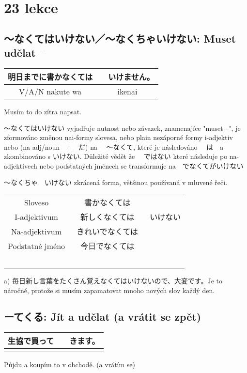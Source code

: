 \section{23 lekce}
\label{sec:lekce_23}




\subsection{〜なくてはいけない／〜なくちゃいけない: Muset udělat --}


\begin{center}
\begin{tabular}{||c|c||}
\hline
明日までに書かなくては&　いけません。\\
\hline
V/A/N nakute wa& ikenai\\
\hline
\end{tabular}
\end{center}

Musím to do zítra napsat.

〜なくてはいけない vyjadřuje nutnost nebo závazek, znamenajíce "muset --", je zformováno změnou nai-formy slovesa, nebo plain nezáporné formy i-adjektiv nebo (na-adj/noun　+　だ) na 　〜なくて, které je následováno 　は　a zkombinováno s いけない. Důležité vědět že 　ではない které následuje po na-adjektivech nebo podstatných jménech se transformuje na　でなくてがいけない

〜なくちゃ　いけない zkrácená forma, většinou používaná v mluvené řeči.

\begin{center}
\begin{tabular}{|c|c|c|}
\hline
Sloveso &書かなくては&\\
I-adjektivum&新しくなくては		&			いけない\\
Na-adjektivum&きれいでなくては&\\
Podstatné jméno&今日でなくては　　&\\
\hline　　
\end{tabular}
\end{center}


a) 毎日新し言葉をたくさん覚えなくてはいけないので、大変です。Je to náročné, protože si musím zapamatovat mnoho nových slov každý den.

\subsection{ーてくる: Jít a udělat (a vrátit se zpět)}
\begin{center}
\begin{tabular}{||c|c||}
\hline
生協で買って&　きます。\\
\hline
&\\
\hline
\end{tabular}
\end{center}
Půjdu a koupím to v obchodě. (a vrátím se)


